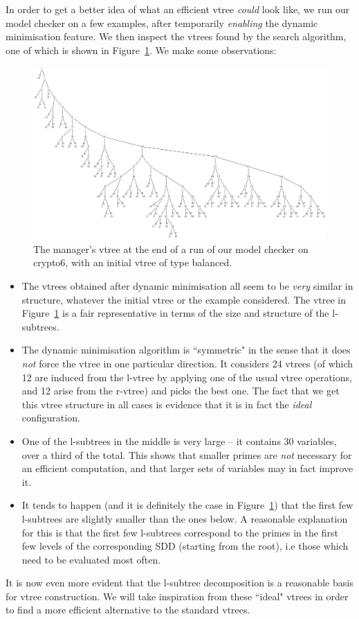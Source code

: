 \documentclass[11pt]{report}
\begin{document}
In order to get a better idea of what an efficient vtree \textit{could} look like, we run our model checker on a few examples, after temporarily \textit{enabling }the dynamic minimisation feature. We then inspect the vtrees found by the search algorithm, one of which is shown in  Figure~\ref{fig:large_vtree_after_reordering}. We make some observations:
\begin{figure}
\includegraphics[scale=0.3]{largevtreeafterdao.png}
\caption{The manager's vtree at the end of a run of our model checker on crypto6, with an initial vtree of type balanced.}
\label{fig:large_vtree_after_reordering} 
\end{figure}
\begin{itemize}
\item The vtrees obtained after dynamic minimisation all seem to be \textit{very }similar in structure, whatever the initial vtree or the example considered. The vtree in Figure~\ref{fig:large_vtree_after_reordering} is a fair representative in terms of the size and structure of the l-subtrees.
\item The dynamic minimisation algorithm is ``symmetric" in the sense that it does \textit{not} force the vtree in one particular direction. It considers 24 vtrees (of which 12 are induced from the l-vtree by applying one of the usual vtree operations, and 12 arise from the r-vtree) and picks the best one. The fact that we get this vtree structure in all cases is evidence that it is in fact the \textit{ideal} configuration. 
\item One of the l-subtrees in the middle is very large -- it contains 30 variables, over a third of the total. This shows that smaller primes are \textit{not }necessary for an efficient computation, and that larger sets of variables may in fact improve it. 
\item It tends to happen (and it is definitely the case in Figure~\ref{fig:large_vtree_after_reordering}) that the first few l-subtrees are slightly smaller than the ones below. A reasonable explanation for this is that the first few l-subtrees correspond to the primes in the first few levels of the corresponding SDD (starting from the root), i.e those which need to be evaluated most often.
\end{itemize}
It is now even more evident that the l-subtree decomposition is a reasonable basis for vtree construction. We will take inspiration from these ``ideal" vtrees in order to find a more efficient alternative to the standard vtrees. 
\end{document}
